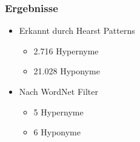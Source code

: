 \begin{frame}
  \frametitle{Ergebnisse}

  \begin{itemize}
  \item Erkannt durch Hearst Patterns
    \begin{itemize}
    \item 2.716 Hypernyme
    \item 21.028 Hyponyme
    \end{itemize}

  \item Nach WordNet Filter
    \begin{itemize}
    \item 5 Hypernyme
    \item 6 Hyponyme
    \end{itemize}

  \end{itemize}
\end{frame}
